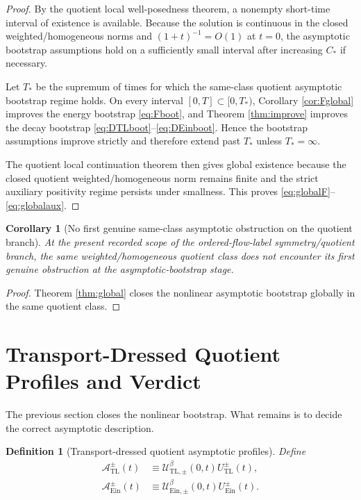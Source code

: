 \documentclass[11pt]{article}
\newtheorem{definition}{Definition}
\newtheorem{corollary}{Corollary}
\begin{document}
\begin{proof}
By the quotient local well-posedness theorem, a nonempty short-time interval of existence is available. Because the solution is continuous in the closed weighted/homogeneous norms and \((1+t)^{-1}=O(1)\) at \(t=0\), the asymptotic bootstrap assumptions hold on a sufficiently small interval after increasing \(C_\ast\) if necessary.

Let \(T_\ast\) be the supremum of times for which the same-class quotient asymptotic bootstrap regime holds. On every interval \([0,T]\subset [0,T_\ast)\), Corollary \ref{cor:Fglobal} improves the energy bootstrap \eqref{eq:Fboot}, and Theorem \ref{thm:improve} improves the decay bootstrap \eqref{eq:DTLboot}--\eqref{eq:DEinboot}. Hence the bootstrap assumptions improve strictly and therefore extend past \(T_\ast\) unless \(T_\ast=\infty\).

The quotient local continuation theorem then gives global existence because the closed quotient weighted/homogeneous norm remains finite and the strict auxiliary positivity regime persists under smallness. This proves \eqref{eq:globalF}--\eqref{eq:globalaux}.
\end{proof}

\begin{corollary}[No first genuine same-class asymptotic obstruction on the quotient branch]
\label{cor:noobs}
At the present recorded scope of the ordered-flow-label symmetry/quotient branch,
the same weighted/homogeneous quotient class does \emph{not} encounter its first
genuine obstruction at the asymptotic-bootstrap stage.
\end{corollary}

\begin{proof}
Theorem \ref{thm:global} closes the nonlinear asymptotic bootstrap globally in the same quotient class.
\end{proof}

\section{Transport-Dressed Quotient Profiles and Verdict}

The previous section closes the nonlinear bootstrap. What remains is to decide the correct asymptotic description.

\begin{definition}[Transport-dressed quotient asymptotic profiles]
\label{def:profiles2}
Define
\begin{align}
\mathcal A_{\mathrm{TL}}^\pm(t)
&\equiv
\mathcal U_{\mathrm{TL},\pm}^\beta(0,t)U_{\mathrm{TL}}^\pm(t),
\label{eq:ATL}
\\
\mathcal A_{\mathrm{Ein}}^\pm(t)
&\equiv
\mathcal U_{\mathrm{Ein},\pm}^\beta(0,t)U_{\mathrm{Ein}}^\pm(t).
\label{eq:AEin}
\end{align}
\end{definition}
\end{document}
